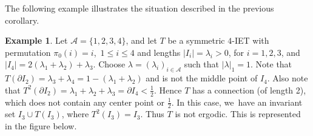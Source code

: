 \documentclass[JEP,XML,SOM,Unicode,NoEqCountersInSection,NoFloatCountersInSection,published]{cedram}
\theoremstyle{plain}
\theoremstyle{definition}
\newtheorem{example}[theorem]{Example}
\newcommand{\A}{\mathcal{A}}
\begin{document}
The following example illustrates the situation described in the previous corollary.

\begin{example}\label{ex:1}
Let $\mathcal{A}=\{1,2,3,4\}$, and let $T$ be a symmetric $4$-IET with permutation $\pi_0(i)=i$,\, $1\le i\le 4$ and lengths $|I_i|=\lambda_i>0$, for $i=1,2,3$, and $|I_4|=2(\lambda_1+\lambda_2)+\lambda_3$. Choose $\lambda = (\lambda_i)_{i \in \A}$ such that $|\lambda|_1 = 1$. Note that $T(\partial I_2)= \lambda_3 + \lambda_4 = 1- (\lambda_1+\lambda_2)$ and is not the middle point of $I_4$. Also note that $T^2(\partial I_2)=\lambda_1+\lambda_2+\lambda _3=\partial I_4<\frac{1}{2}$. Hence $T$ has a connection (of length 2), which does not contain any center point or $\frac{1}{2}$. In this case, we~have an invariant set $I_3\cup T(I_3)$, where $T^2(I_3)=I_3$. Thus $T$ is not ergodic. This is represented in the figure below.
\end{example}
\end{document}
